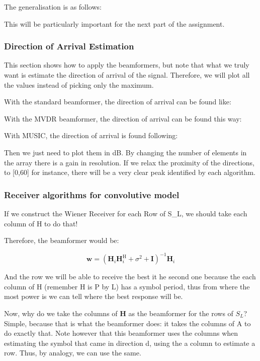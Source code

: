 \documentclass[12pt, a4paper]{article}
\begin{document}
The generalisation is as follows: 


This will be particularly important for the next part of the assignment.


\subsubsection{Direction of Arrival Estimation}

This section shows how to apply the beamformers, but note that what we truly want is estimate the direction of arrival of the signal. Therefore, we will plot all the values instead of picking only the maximum.

With the standard beamformer, the direction of arrival can be found like:

With the MVDR beamformer, the direction of arrival can be found this way:

With MUSIC, the direction of arrival is found following:


\par Then we just need to plot them in dB. By changing the number of elements in the array there is a gain in resolution. If we relax the proximity of the directions, to [0\degree,60\degree] for instance, there will be a very clear peak identified by each algorithm.


\subsubsection{Receiver algorithms for convolutive model}
If we construct the Wiener Receiver for each Row of S\_L, we should take each column of H to do that!

Therefore, the beamformer would be:

\begin{equation}
    \mathbf{w} = (\mathbf{H}_i\mathbf{H}_i^\text{H} + \sigma^2 + \mathbf{I})^{-1} \mathbf{H}_i
\end{equation}

And the row we will be able to receive the best it he second one because the each column of H (remember H is P by L) has a symbol period, thus from where the most power is we can tell where the best response will be.  

Now, why do we take the columns of $\mathbf{H}$ as the beamformer for the rows of $S_L$? Simple, because that is what the beamformer does: it takes the columns of A to do exactly that. Note however that this beamformer uses the columns when estimating the symbol that came in direction d, using the a column to estimate a row. Thus, by analogy, we can use the same.
\end{document}
